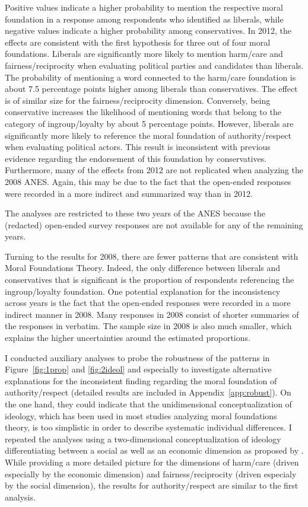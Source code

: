\documentclass[12pt]{article}
\begin{document}
Positive values indicate a higher probability to mention the respective moral foundation in a response among respondents who identified as liberals, while negative values indicate a higher probability among conservatives. In 2012, the effects are consistent with the first hypothesis for three out of four moral foundations. Liberals are significantly more likely to mention harm/care and fairness/reciprocity when evaluating political parties and candidates than liberals. The probability of mentioning a word connected to the harm/care foundation is about 7.5 percentage points higher among liberals than conservatives. The effect is of similar size for the fairness/reciprocity dimension. Conversely, being conservative increases the likelihood of mentioning words that belong to the category of ingroup/loyalty by about 5 percentage points. However, liberals are significantly more likely to reference the moral foundation of authority/respect when evaluating political actors. This result is inconsistent with previous evidence regarding the endorsement of this foundation by conservatives. Furthermore, many of the effects from 2012 are not replicated when analyzing the 2008 ANES. Again, this may be due to the fact that the open-ended responses were recorded in a more indirect and summarized way than in 2012.

The analyses are restricted to these two years of the ANES because the (redacted) open-ended survey responses are not available for any of the remaining years.

Turning to the results for 2008, there are fewer patterns that are consistent with Moral Foundations Theory. Indeed, the only difference between liberals and conservatives that is significant is the proportion of respondents referencing the ingroup/loyalty foundation. One potential explanation for the inconsistency across years is the fact that the open-ended responses were recorded in a more indirect manner in 2008. Many responses in 2008 consist of shorter summaries of the responses in verbatim. The sample size in 2008 is also much smaller, which explains the higher uncertainties around the estimated proportions.

I conducted auxiliary analyses to probe the robustness of the patterns in Figure~\ref{fig:1prop} and \ref{fig:2ideol} and especially to investigate alternative explanations for the inconsistent finding regarding the moral foundation of authority/respect (detailed results are included in Appendix~\ref{app:robust}). On the one hand, they could indicate that the unidimensional conceptualization of ideology, which has been used in most studies analyzing moral foundations theory, is too simplistic in order to describe systematic individual differences. I repeated the analyses using a two-dimensional conceptualization of ideology differentiating between a social as well as an economic dimension as proposed by \citet{feldman2014understanding}. While providing a more detailed picture for the dimensions of harm/care (driven especially by the economic dimension) and fairness/reciprocity (driven especialy by the social dimension), the results for authority/respect are similar to the first analysis.
\end{document}
